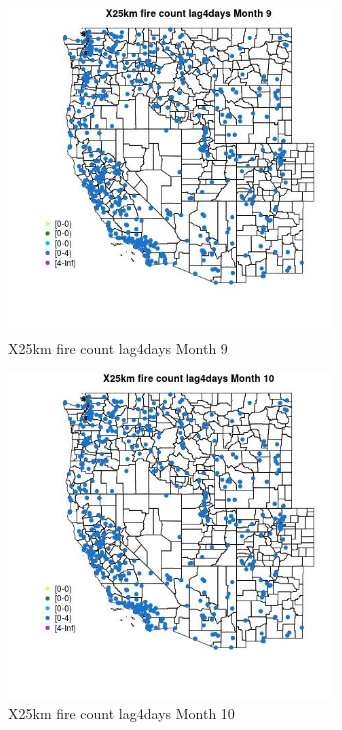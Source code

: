 \begin{figure} 
\centering  
\includegraphics[width=0.77\textwidth]{Code_Outputs/Report_ML_input_PM25_Step4_part_e_de_duplicated_aves_compiled_2019-05-14wNAs_MapObsMo9X25km_fire_count_lag4days.jpg} 
\caption{\label{fig:Report_ML_input_PM25_Step4_part_e_de_duplicated_aves_compiled_2019-05-14wNAsMapObsMo9X25km_fire_count_lag4days}X25km fire count lag4days Month 9} 
\end{figure} 
 

\begin{figure} 
\centering  
\includegraphics[width=0.77\textwidth]{Code_Outputs/Report_ML_input_PM25_Step4_part_e_de_duplicated_aves_compiled_2019-05-14wNAs_MapObsMo10X25km_fire_count_lag4days.jpg} 
\caption{\label{fig:Report_ML_input_PM25_Step4_part_e_de_duplicated_aves_compiled_2019-05-14wNAsMapObsMo10X25km_fire_count_lag4days}X25km fire count lag4days Month 10} 
\end{figure} 
 

